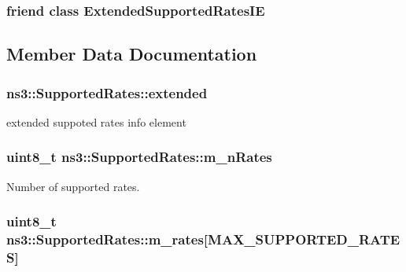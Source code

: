 \subsubsection[{\texorpdfstring{Extended\+Supported\+Rates\+IE}{ExtendedSupportedRatesIE}}]{\setlength{\rightskip}{0pt plus 5cm}friend class {\bf Extended\+Supported\+Rates\+IE}\hspace{0.3cm}{\ttfamily [friend]}}\hypertarget{classns3_1_1SupportedRates_ac4af3e8b73361f2e64c62e41011c7517}{}\label{classns3_1_1SupportedRates_ac4af3e8b73361f2e64c62e41011c7517}


\subsection{Member Data Documentation}
\subsubsection[{\texorpdfstring{extended}{extended}}]{ ns3\+::\+Supported\+Rates\+::extended}\hypertarget{classns3_1_1SupportedRates_a313f3392cbf8248cf2822d53f3914aaf}{}\label{classns3_1_1SupportedRates_a313f3392cbf8248cf2822d53f3914aaf}


extended suppoted rates info element 

\subsubsection[{\texorpdfstring{m\+\_\+n\+Rates}{m_nRates}}]{\setlength{\rightskip}{0pt plus 5cm}uint8\+\_\+t ns3\+::\+Supported\+Rates\+::m\+\_\+n\+Rates\hspace{0.3cm}{\ttfamily [private]}}\hypertarget{classns3_1_1SupportedRates_a48bc8bd88b3c7abae9fcd75fd40c4279}{}\label{classns3_1_1SupportedRates_a48bc8bd88b3c7abae9fcd75fd40c4279}


Number of supported rates. 

\subsubsection[{\texorpdfstring{m\+\_\+rates}{m_rates}}]{\setlength{\rightskip}{0pt plus 5cm}uint8\+\_\+t ns3\+::\+Supported\+Rates\+::m\+\_\+rates\mbox{[}{\bf M\+A\+X\+\_\+\+S\+U\+P\+P\+O\+R\+T\+E\+D\+\_\+\+R\+A\+T\+ES}\mbox{]}\hspace{0.3cm}{\ttfamily [private]}}\hypertarget{classns3_1_1SupportedRates_a4b17159f12e29a88e82b8a92507e4884}{}\label{classns3_1_1SupportedRates_a4b17159f12e29a88e82b8a92507e4884}


